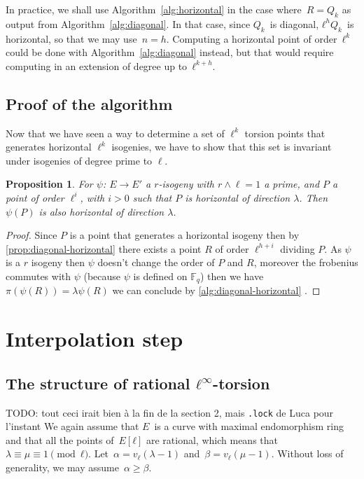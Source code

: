 \documentclass{lms}
\newcommand{\todo}[1]{{\color{red}TODO: #1}}
\newtheorem{prop}[thm]{Proposition}
\begin{document}
In practice, we shall use Algorithm~\ref{alg:horizontal}
in the case where~$R = Q_{k}$ as output from Algorithm~\ref{alg:diagonal}.
In that case, since $Q_k$~is diagonal, $ℓ^{h} Q_k$~is horizontal,
so that we may use~$n=h$.
Computing a horizontal point of order~$ℓ^k$ could be done
with Algorithm~\ref{alg:diagonal} instead,
but that would require computing in an extension
of degree up to~$ℓ^{k+h}$.


\subsection{Proof of the algorithm}
Now that we have seen a way to determine a set of $\ell^{k}$ torsion points that generates horizontal $\ell^k$ isogenies, we have to show that this set is invariant under isogenies of degree prime to $\ell$.

\begin{prop}
For $\psi$: $E \rightarrow E'$ a $r$-isogeny  with $r \wedge \ell=1$ a prime, and $P$ a point of order $\ell^i$, with $i>0$ such that $P $ is horizontal of direction $\lambda$. Then $\psi(P)$ is also horizontal of direction $\lambda$.
\end{prop}

\begin{proof}
Since $P$ is a point that generates a horizontal isogeny then by \ref{prop:diagonal-horizontal} there exists a point $R$ of order $\ell^{h+i}$ dividing $P$. As $\psi$ is a $r$ isogeny then $\psi$ doesn't change the order of $P$ and $R$, moreover the frobenius commutes with $\psi$ (because $\psi$ is defined on $\mathbb{F}_q$) then we have $\pi(\psi(R))=\lambda\psi(R)$ we can conclude by \ref{alg:diagonal-horizontal}  .
\end{proof}




\section{Interpolation step}
\label{sec:interpolation}

\subsection{The structure of rational $ℓ^∞$-torsion}

\todo{tout ceci irait bien à la fin de la section 2, mais \texttt{.lock}
de Luca pour l'instant}
We again assume that $E$~is a curve with maximal endomorphism ring
and that all the points of~$E[ℓ]$ are rational,
which means that~$λ ≡ μ ≡ 1 \pmod{ℓ}$.
Let~$α = v_{ℓ} (λ - 1)$ and~$β = v_{ℓ} (μ - 1)$.
Without loss of generality, we may assume~$α ≥ β$.
\end{document}
